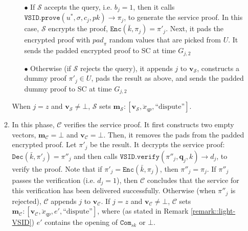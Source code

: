 \begin{enumerate}
\begin{enumerate}
\begin{itemize}
\item[$\bullet$] If $\mathcal S$ accepts the query, i.e. $b_{\scriptscriptstyle j}=1$, then it calls $\mathtt{VSID.prove}(u^{\scriptscriptstyle *},\sigma,c_{\scriptscriptstyle j},pk)\rightarrow \pi_{\scriptscriptstyle j}$, to generate the service proof. In this case, $\mathcal S$ encrypts the proof, $\mathtt{Enc}(\bar{k},\pi_{\scriptscriptstyle j})=\pi'_{\scriptscriptstyle j}$. Next, it   pads the encrypted proof with ${pad}_{\scriptscriptstyle \pi}$ random values that are picked from $U$. It sends the padded encrypted proof  to SC at time $G_{\scriptscriptstyle j,2}$ 

\item[$\bullet$] Otherwise (if $\mathcal S$ rejects the query), it appends $j$  to $\bm{v}_{\scriptscriptstyle\mathcal{S}}$,  constructs a dummy proof $\pi'_{\scriptscriptstyle j}\in U$,  pads the result as above, and sends the padded dummy proof to SC at time $G_{\scriptscriptstyle j,2}$ %


\end{itemize}
When $j=z$  and $\bm{v}_{\scriptscriptstyle\mathcal{S}}\neq\bot$, $\mathcal S$ sets    $\bm{m}_{\scriptscriptstyle\mathcal S}:[\bm{v}_{\scriptscriptstyle\mathcal{S}},\ddot{x}_{\scriptscriptstyle qp}, \text{``dispute''}]$.

\item In this phase,  $\mathcal C$ verifies the service proof. It first constructs two empty vectors, $\bm{m}_{\scriptscriptstyle\mathcal C}=\bot$ and $\bm{v}_{\scriptscriptstyle\mathcal{C}}=\bot$. Then, it  removes the pads from the padded encrypted proof. Let $\pi'_{\scriptscriptstyle j}$ be the result. It decrypts the service proof: $\mathtt{Dec}(\bar{k},\pi'_{\scriptscriptstyle j})=\pi''_{\scriptscriptstyle j}$ and then calls $\mathtt{VSID.verify}(\pi''_{\scriptscriptstyle j}, \bm{q}_{\scriptscriptstyle j},k)\rightarrow d_{\scriptscriptstyle j}$, to verify the proof. Note that if $\pi'_{\scriptscriptstyle j}=\mathtt{Enc}(\bar{k},\pi_{\scriptscriptstyle j})$, then $\pi''_{\scriptscriptstyle j}=\pi_{\scriptscriptstyle j}$. If $\pi''_{\scriptscriptstyle j}$ passes the verification (i.e. $d_{\scriptscriptstyle j}=1$), then $\mathcal C$ concludes that the service  for this verification has been delivered successfully. Otherwise (when $\pi''_{\scriptscriptstyle j}$ is rejected), $\mathcal C$ appends $j$  to $\bm{v}_{\scriptscriptstyle\mathcal{C}}$. If $j=z$  and $\bm{v}_{\scriptscriptstyle\mathcal{C}}\neq\bot$, $\mathcal C$ sets    $\bm{m}_{\scriptscriptstyle\mathcal C}:[\bm{v}_{\scriptscriptstyle\mathcal{C}},\ddot{x}_{\scriptscriptstyle qp},e', \text{``dispute''}]$, where (as stated in Remark \ref{remark::light-VSID}) $e'$  contains the opening of $\mathtt{Com}_{\scriptscriptstyle sk}$ or  $\bot$.


\end{enumerate}
\end{enumerate}

